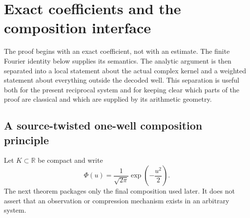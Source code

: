 \section{Exact coefficients and the composition interface}
\label{sec:composition-interface}

The proof begins with an exact coefficient, not with an estimate.  The finite Fourier identity below supplies its semantics.  The analytic argument is then separated into a local statement about the actual complex kernel and a weighted statement about everything outside the decoded well.  This separation is useful both for the present reciprocal system and for keeping clear which parts of the proof are classical and which are supplied by its arithmetic geometry.


\subsection{A source-twisted one-well composition principle}

Let $K\subset\mathbb R$ be compact and write
\[
 \Phi(u)=\frac{1}{\sqrt{2\pi}}\exp\!\left(-\frac{u^2}{2}\right).
\]
The next theorem packages only the final composition used later.  It does not assert that an observation or compression mechanism exists in an arbitrary system.

